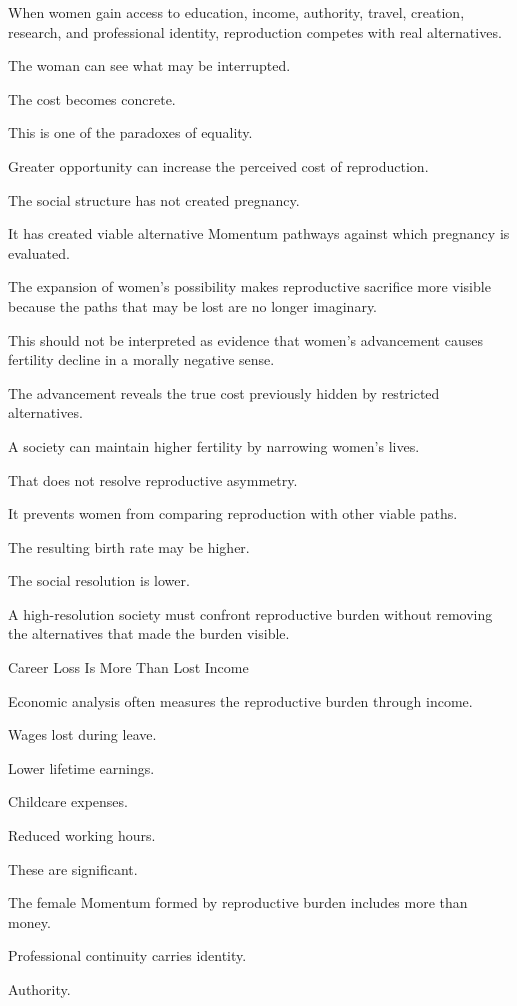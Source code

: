 When women gain access to education, income, authority, travel, creation, research, and professional identity, reproduction competes with real alternatives.

The woman can see what may be interrupted.

The cost becomes concrete.

This is one of the paradoxes of equality.

Greater opportunity can increase the perceived cost of reproduction.

The social structure has not created pregnancy.

It has created viable alternative Momentum pathways against which pregnancy is evaluated.

The expansion of women’s possibility makes reproductive sacrifice more visible because the paths that may be lost are no longer imaginary.

This should not be interpreted as evidence that women’s advancement causes fertility decline in a morally negative sense.

The advancement reveals the true cost previously hidden by restricted alternatives.

A society can maintain higher fertility by narrowing women’s lives.

That does not resolve reproductive asymmetry.

It prevents women from comparing reproduction with other viable paths.

The resulting birth rate may be higher.

The social resolution is lower.

A high-resolution society must confront reproductive burden without removing the alternatives that made the burden visible.

Career Loss Is More Than Lost Income

Economic analysis often measures the reproductive burden through income.

Wages lost during leave.

Lower lifetime earnings.

Childcare expenses.

Reduced working hours.

These are significant.

The female Momentum formed by reproductive burden includes more than money.

Professional continuity carries identity.

Authority.

